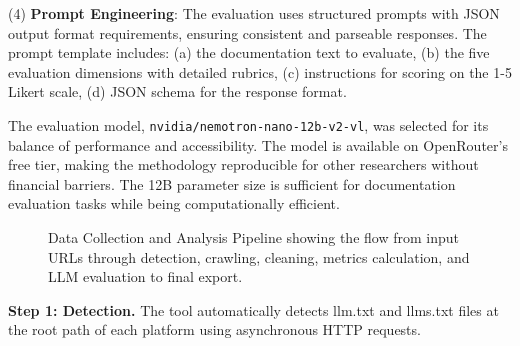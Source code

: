 \documentclass[10pt,conference,a4paper]{IEEEtran}
\begin{document}
(4) \textbf{Prompt Engineering}: The evaluation uses structured prompts with JSON output format requirements, ensuring consistent and parseable responses. The prompt template includes: (a) the documentation text to evaluate, (b) the five evaluation dimensions with detailed rubrics, (c) instructions for scoring on the 1-5 Likert scale, (d) JSON schema for the response format.

The evaluation model, \texttt{nvidia/nemotron-nano-12b-v2-vl}, was selected for its balance of performance and accessibility. The model is available on OpenRouter's free tier, making the methodology reproducible for other researchers without financial barriers. The 12B parameter size is sufficient for documentation evaluation tasks while being computationally efficient.

\begin{figure}[htbp]
    \centering
    \caption{Data Collection and Analysis Pipeline showing the flow from input URLs through detection, crawling, cleaning, metrics calculation, and LLM evaluation to final export.}
    \label{fig:pipeline}
\end{figure}

\textbf{Step 1: Detection.} The tool automatically detects llm.txt and llms.txt files at the root path of each platform using asynchronous HTTP requests.
\end{document}
